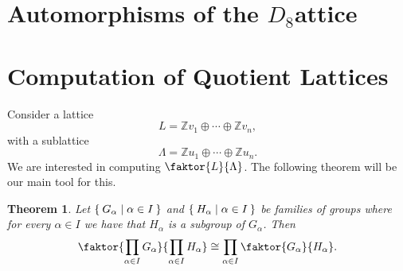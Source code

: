 \documentclass{article}
\newtheorem{theorem}{Theorem}
\begin{document}
 
 \section{Automorphisms of the \texorpdfstring{$D_8$} lattice}
 
 
 

\section{Computation of Quotient Lattices}

Consider a lattice
\begin{equation}
    L=\mathbb{Z}v_1\oplus\cdots\oplus\mathbb{Z}v_n,
\end{equation}
with a sublattice
\begin{equation}
    \Lambda=\mathbb{Z}u_1\oplus\cdots\oplus\mathbb{Z}u_n.
\end{equation}
We are interested in computing $\faktor{L}{\Lambda}$. The following theorem will be our main tool for this.
\begin{theorem}
Let $\Set{G_\alpha|\alpha\in I}$ and $\Set{H_\alpha|\alpha\in I}$ be families of groups where for every $\alpha\in I$ we have that $H_\alpha$ is a subgroup of $G_\alpha$. Then
\begin{equation}
    \faktor{\prod_{\alpha\in I}G_\alpha}{\prod_{\alpha\in I}H_\alpha}\cong\prod_{\alpha\in I}\faktor{G_\alpha}{H_\alpha}.
\end{equation}
\end{theorem}
\end{document}
